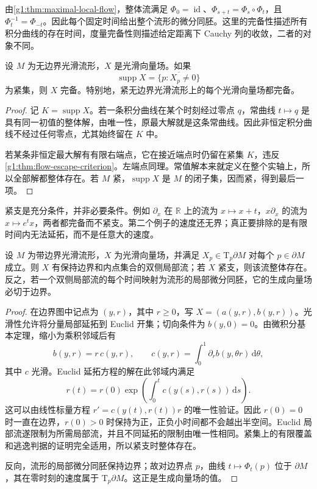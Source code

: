 由\cref{g1:thm:maximal-local-flow}，整体流满足 \(\Phi_0=\operatorname{id}\)、\(\Phi_{s+t}=\Phi_s\circ\Phi_t\)，且 \(\Phi_t^{-1}=\Phi_{-t}\)。因此每个固定时间给出整个流形的微分同胚。这里的完备性描述所有积分曲线的存在时间，度量完备性则描述给定距离下 Cauchy 列的收敛，二者的对象不同。

\begin{theorem}
	\label{g1:thm:compact-support-complete}
	设 \(M\) 为无边界光滑流形，\(X\) 是光滑向量场。如果
	\[
		\operatorname{supp}X=\overline{\{p:X_p\neq0\}}
	\]
	为紧集，则 \(X\) 完备。特别地，紧无边界光滑流形上的每个光滑向量场都完备。
\end{theorem}
\begin{proof}
	记 \(K=\operatorname{supp}X\)。若一条积分曲线在某个时刻经过零点 \(q\)，常曲线 \(t\mapsto q\) 是具有同一初值的整体解，由唯一性，原最大解就是这条常曲线。因此非恒定积分曲线不经过任何零点，尤其始终留在 \(K\) 中。

	若某条非恒定最大解有有限右端点，它在接近端点时仍留在紧集 \(K\)，违反\cref{g1:thm:flow-escape-criterion}。左端点同理。常值解本来就定义在整个实轴上，所以全部解都整体存在。若 \(M\) 紧，\(\operatorname{supp}X\) 是 \(M\) 的闭子集，因而紧，得到最后一项。
\end{proof}

紧支是充分条件，并非必要条件。例如 \(\partial_x\) 在 \(\mathbb R\) 上的流为 \(x\mapsto x+t\)，\(x\partial_x\) 的流为 \(x\mapsto e^t x\)，两者都完备而不紧支。第二个例子的速度还无界；真正要排除的是有限时间内无法延拓，而不是任意大的速度。

\begin{proposition}
	\label{g1:prop:boundary-tangent-flow}
	设 \(M\) 为带边界光滑流形，\(X\) 为光滑向量场，并满足 \(X_p\in \mathrm{T}_p\partial M\) 对每个 \(p\in\partial M\) 成立。则 \(X\) 有保持边界和内点集合的双侧局部流；若 \(X\) 紧支，则该流整体存在。反之，若一个双侧局部流的每个时间映射为流形的局部微分同胚，它的生成向量场必切于边界。
\end{proposition}
\begin{proof}
	在边界图中记点为 \((y,r)\)，其中 \(r\geq0\)，写 \(X=(a(y,r),b(y,r))\)。光滑性允许将分量局部延拓到 Euclid 开集；切向条件为 \(b(y,0)=0\)。由微积分基本定理，缩小为乘积邻域后有
	\[
		b(y,r)=r\,c(y,r),\qquad c(y,r)=\int_0^1\partial_r b(y,\theta r)\,\mathrm{d}\theta,
	\]
	其中 \(c\) 光滑。Euclid 延拓方程的解在此邻域内满足
	\[
		r(t)=r(0)\exp\!\left(\int_0^t c(y(s),r(s))\,\mathrm{d}s\right).
	\]
	这可以由线性标量方程 \(r'=c(y(t),r(t))r\) 的唯一性验证。因此 \(r(0)=0\) 时一直在边界，\(r(0)>0\) 时保持为正，正负小时间都不会越出半空间。Euclid 局部流遂限制为所需局部流，并且不同延拓的限制由唯一性相同。紧集上的有限覆盖和逃逸判据的证明完全适用，所以紧支时整体存在。

	反向，流形的局部微分同胚保持边界；故对边界点 \(p\)，曲线 \(t\mapsto\Phi_t(p)\) 位于 \(\partial M\)，其在零时刻的速度属于 \(\mathrm{T}_p\partial M\)。这正是生成向量场的值。
\end{proof}


